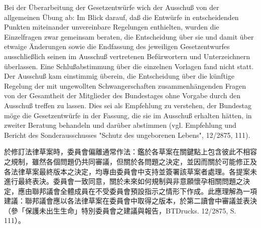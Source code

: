\documentclass[12pt]{article}
\begin{document}
\begin{sourcepara}[title={原文理由 A.II.2.b--c} Rn 44]
Bei der Überarbeitung der Gesetzentwürfe wich der Ausschuß von der allgemeinen Übung ab: Im Blick darauf, daß die Entwürfe in entscheidenden Punkten miteinander unvereinbare Regelungen enthielten, wurden die Einzelfragen zwar gemeinsam beraten, die Entscheidung über sie und damit über etwaige Änderungen sowie die Endfassung des jeweiligen Gesetzentwurfes ausschließlich seinen im Ausschuß vertretenen Befürwortern und Unterzeichnern überlassen. Eine Schlußabstimmung über die einzelnen Vorlagen fand nicht statt. Der Ausschuß kam einstimmig überein, die Entscheidung über die künftige Regelung der mit ungewollten Schwangerschaften zusammenhängenden Fragen von der Gesamtheit der Mitglieder des Bundestages ohne Vorgabe durch den Ausschuß treffen zu lassen. Dies sei als Empfehlung zu verstehen, der Bundestag möge die Gesetzentwürfe in der Fassung, die sie im Ausschuß erhalten hätten, in zweiter Beratung behandeln und darüber abstimmen (vgl. Empfehlung und Bericht des Sonderausschusses "Schutz des ungeborenen Lebens", \abbrBTDrucks{} 12/2875, \abbrS{} 111).
\end{sourcepara}
\begin{transpara}
於修訂法律草案時，委員會偏離通常作法：鑑於各草案在關鍵點上包含彼此不相容之規制，雖然各個問題仍共同審議，但關於各問題之決定，並因而關於可能修正及各法律草案最終版本之決定，均專由委員會中支持並簽署該草案者處理。各提案未進行最終表決。委員會一致同意，關於未來如何規制與非意願懷孕相關問題之決定，應由聯邦議會全體成員在不受委員會預設指示之情形下作成。此應理解為一項建議：聯邦議會應以各法律草案在委員會中取得之版本，於第二讀會中審議並表決（參「保護未出生生命」特別委員會之建議與報告，BTDrucks. 12/2875, S. 111）。
\end{transpara}
\end{document}
